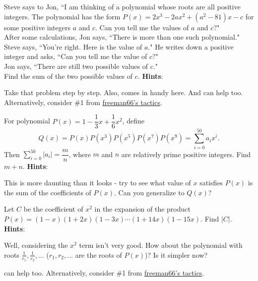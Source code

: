 \documentclass[11pt,titlepage]{scrartcl}
\newenvironment{hint}{\footnotesize \normalfont \textbf{Hints}:}{\hspace{-0.5ex}}
\begin{document}
\begin{problem}
Steve says to Jon, ``I am thinking of a polynomial whose roots are all positive integers. The polynomial has the form $P(x) = 2x^3-2ax^2+(a^2-81)x-c$ for some positive integers $a$ and $c$. Can you tell me the values of $a$ and $c$?"\\[1\baselineskip]
After some calculations, Jon says, ``There is more than one such polynomial."\\[1\baselineskip]
Steve says, ``You're right. Here is the value of $a$." He writes down a positive integer and asks, ``Can you tell me the value of $c$?"\\[1\baselineskip]
Jon says, ``There are still two possible values of $c$."\\[1\baselineskip]
Find the sum of the two possible values of $c$.
\begin{hint}
\begin{addhint}{
Take that problem step by step. Also,  comes in handy here. And  can help too. Alternatively, consider \#1 from \hyperlink{freelist}{freeman66's tactics}.
}\end{addhint}
\end{hint}
\end{problem}
\begin{problem}
For polynomial $P(x)=1-\dfrac{1}{3}x+\dfrac{1}{6}x^{2}$, define
\[Q(x)=P(x)P(x^{3})P(x^{5})P(x^{7})P(x^{9})=\sum_{i=0}^{50} a_ix^{i}.\]
Then $\sum\limits_{i=0}^{50} |a_i|=\dfrac{m}{n}$, where $m$ and $n$ are relatively prime positive integers. Find $m+n$.
\begin{hint}
\begin{addhint}{
This is more daunting than it looks - try to see what value of $x$ satisfies $P(x)$ is the sum of the coefficients of $P(x)$. Can you generalize to $Q(x)$?
}\end{addhint}
\end{hint}
\end{problem}
\begin{problem}
Let $C$ be the coefficient of $x^2$ in the expansion of the product $P(x)=(1 - x)(1 + 2x)(1 - 3x)\cdots(1 + 14x)(1 - 15x).$ Find $|C|.$
\begin{hint}
\begin{addhint}{
Well, considering the $x^2$ term isn't very good. How about the polynomial with roots $\tfrac 1{r_1},\tfrac{1}{r_2},\ldots$ ($r_1,r_2,\ldots$ are the roots of $P(x)$)? Is it simpler now?
}\end{addhint}
\begin{addhint}{
 can help too. Alternatively, consider \#1 from \hyperlink{freelist}{freeman66's tactics}.
}\end{addhint}
\end{hint}
\end{problem}
\end{document}
